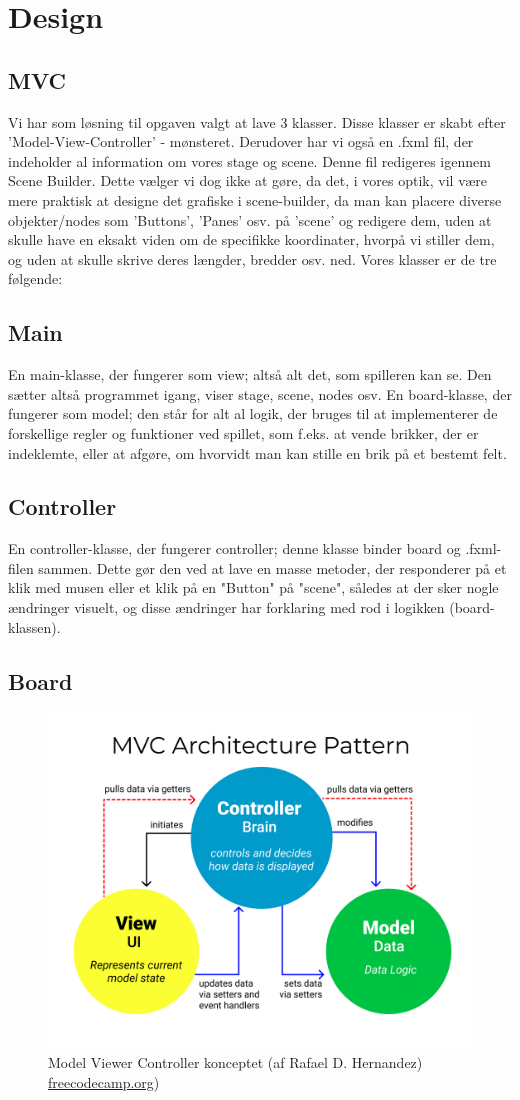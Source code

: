 \section{Design}
\subsection{MVC}\label{MVC}
Vi har som løsning til opgaven valgt at lave 3 klasser. Disse klasser er skabt efter 'Model-View-Controller' - mønsteret. Derudover har vi også en .fxml fil, der indeholder al information om vores stage og scene. Denne fil redigeres igennem Scene Builder. Dette vælger vi dog ikke at gøre, da det, i vores optik, vil være mere praktisk at designe det grafiske i scene-builder, da man kan placere diverse objekter/nodes som 'Buttons', 'Panes' osv. på 'scene' og redigere dem, uden at skulle have en eksakt viden om de specifikke koordinater, hvorpå vi stiller dem, og uden at skulle skrive deres længder, bredder osv. ned. Vores klasser er de tre følgende:
\subsection{Main}
En main-klasse, der fungerer som view; altså alt det, som spilleren kan se. Den sætter altså programmet igang, viser stage, scene, nodes osv. En board-klasse, der fungerer som model; den står for alt al logik, der bruges til at implementerer de forskellige regler og funktioner ved spillet, som f.eks. at vende brikker, der er indeklemte, eller at afgøre, om hvorvidt man kan stille en brik på et bestemt felt. 
\subsection{Controller}
En controller-klasse, der fungerer controller; denne klasse binder board og .fxml-filen sammen. Dette gør den ved at lave en masse metoder, der responderer på et klik med musen eller et klik på en "Button" på "scene", således at der sker nogle ændringer visuelt, og disse ændringer har forklaring med rod i logikken (board-klassen).
\subsection{Board}
\begin{figure}[H]
    \centering
    \caption{Model Viewer Controller konceptet (af Rafael D. Hernandez) \href{https://www.freecodecamp.org/news/the-model-view-controller-pattern-mvc-architecture-and-frameworks-explained/}{freecodecamp.org})}\label{fig:my_label}
    \includegraphics[width=.5\textwidth]{Graphics/MVC3.png}
\end{figure}

